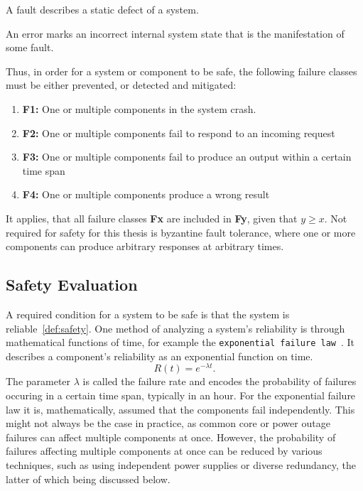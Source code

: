\begin{definition}
A fault describes a static defect of a system.
\end{definition}

\begin{definition}
An error marks an incorrect internal system state that is the manifestation of some fault.
\end{definition}

Thus, in order for a system or component to be safe, the following failure classes must be either prevented, or detected and mitigated:

\begin{enumerate}
\item \textbf{F1:} One or multiple components in the system crash.
\item \textbf{F2:} One or multiple components fail to respond to an incoming request
\item \textbf{F3:} One or multiple components fail to produce an output within a certain time span
\item \textbf{F4:} One or multiple components produce a wrong result
\end{enumerate}

It applies, that all failure classes \textbf{Fx} are included in \textbf{Fy}, given that $y \geq x$.
Not required for safety for this thesis is byzantine fault tolerance, where one or more components can produce arbitrary responses at arbitrary times.

\subsection{Safety Evaluation}
\label{sec:safetyEvaluation}
A required condition for a system to be safe is that the system is reliable~\autoref{def:safety}.
One method of analyzing a system's reliability is through mathematical functions of time, for example the \texttt{exponential failure law}~\cite{GeffroyMotetDependableComputing}.
It describes a component's reliability as an exponential function on time.
\begin{equation}
R(t) = e^{-\lambda t}.
\label{eq:expFailureLaw}
\end{equation}
The parameter $\lambda$ is called the failure rate and encodes the probability of failures occuring in a certain time span, typically in an hour.
For the exponential failure law it is, mathematically, assumed that the components fail independently.
This might not always be the case in practice, as common core or power outage failures can affect multiple components at once.
However, the probability of failures affecting multiple components at once can be reduced by various techniques, such as using independent power supplies or diverse redundancy, the latter of which being discussed below.
\\


